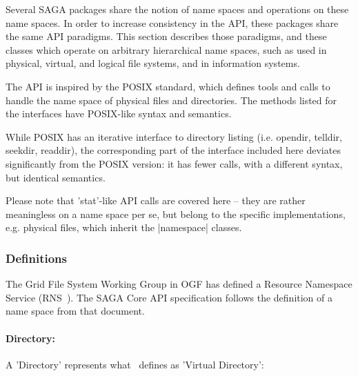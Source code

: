  
  Several SAGA packages share the notion of name spaces and
  operations on these name spaces.  In order to increase
  consistency in the API, these packages share the same
  API paradigms.  This section describes those paradigms, and
  these classes which operate on arbitrary hierarchical
  name spaces, such as used in physical, virtual, and logical file
  systems, and in information systems.
 
  The API is inspired by the POSIX standard, which defines tools
  and calls to handle the name space of physical files
  and directories.  The methods listed for the interfaces
  have POSIX-like syntax and semantics.
 
  While POSIX has an iterative interface to directory listing
  (i.e. opendir, telldir, seekdir, readdir), the corresponding
  part of the interface included here deviates significantly
  from the POSIX version: it has fewer calls, with a different
  syntax, but identical semantics.
 
  Please note that 'stat'-like API calls are  covered
  here -- they are rather meaningless on a name space per se,
  but belong to the specific implementations, e.g.  physical
  files, which inherit the |namespace| classes.
 
  \subsubsection{Definitions}
 
   The Grid File System Working Group in OGF has defined a
   Resource Name\-space Service (RNS~\cite{rns}).  The SAGA Core
   API specification follows the definition of a name space from
   that document.
 
   \paragraph{Directory:}
 
     A 'Directory' represents what~\cite{rns} defines as 'Virtual
     Directory':
 
